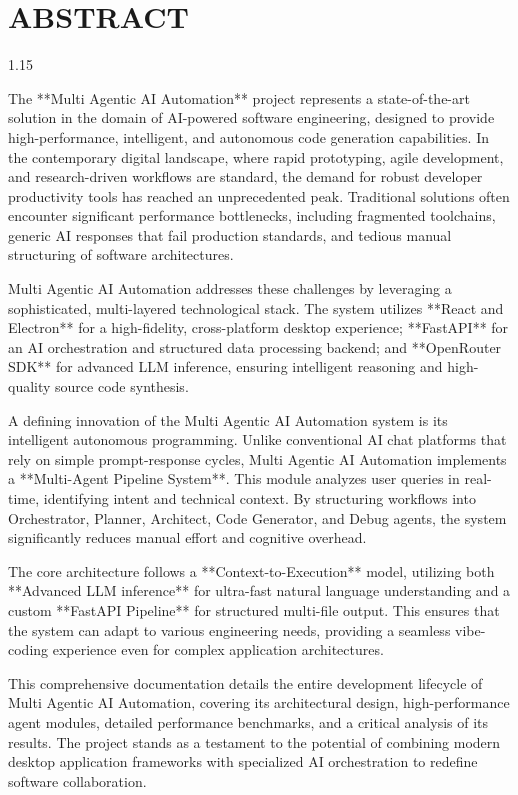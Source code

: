 \documentclass[
  12pt,
]{article}
\author{}
\date{}
\begin{document}
{
\setcounter{tocdepth}{3}
\tableofcontents
}
\listoffigures
\listoftables
\section*{ABSTRACT}\label{abstract}

\begin{spacing}{1.15}
\fontsize{13pt}{16pt}\selectfont

The **Multi Agentic AI Automation** project represents a state-of-the-art solution in the domain of AI-powered software engineering, designed to provide high-performance, intelligent, and autonomous code generation capabilities. In the contemporary digital landscape, where rapid prototyping, agile development, and research-driven workflows are standard, the demand for robust developer productivity tools has reached an unprecedented peak. Traditional solutions often encounter significant performance bottlenecks, including fragmented toolchains, generic AI responses that fail production standards, and tedious manual structuring of software architectures.

Multi Agentic AI Automation addresses these challenges by leveraging a sophisticated, multi-layered technological stack. The system utilizes **React and Electron** for a high-fidelity, cross-platform desktop experience; **FastAPI** for an AI orchestration and structured data processing backend; and **OpenRouter SDK** for advanced LLM inference, ensuring intelligent reasoning and high-quality source code synthesis.

A defining innovation of the Multi Agentic AI Automation system is its intelligent autonomous programming. Unlike conventional AI chat platforms that rely on simple prompt-response cycles, Multi Agentic AI Automation implements a **Multi-Agent Pipeline System**. This module analyzes user queries in real-time, identifying intent and technical context. By structuring workflows into Orchestrator, Planner, Architect, Code Generator, and Debug agents, the system significantly reduces manual effort and cognitive overhead.

The core architecture follows a **Context-to-Execution** model, utilizing both **Advanced LLM inference** for ultra-fast natural language understanding and a custom **FastAPI Pipeline** for structured multi-file output. This ensures that the system can adapt to various engineering needs, providing a seamless vibe-coding experience even for complex application architectures.

This comprehensive documentation details the entire development lifecycle of Multi Agentic AI Automation, covering its architectural design, high-performance agent modules, detailed performance benchmarks, and a critical analysis of its results. The project stands as a testament to the potential of combining modern desktop application frameworks with specialized AI orchestration to redefine software collaboration.

\end{spacing}
\end{document}

